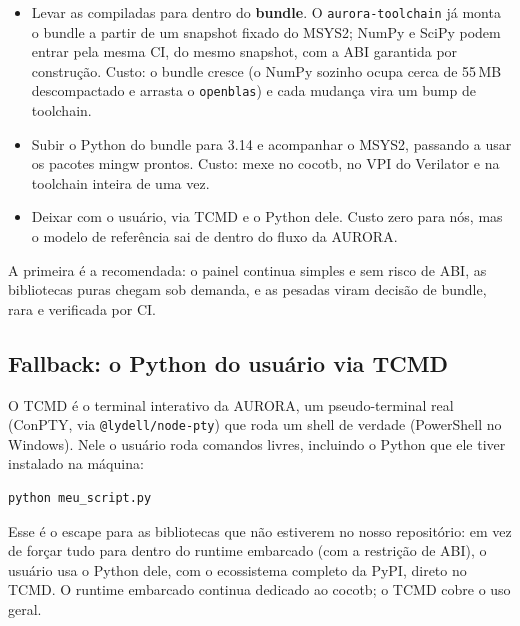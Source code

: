 \documentclass[11pt,a4paper]{article}
\begin{document}
\begin{itemize}
  \item Levar as compiladas para dentro do \textbf{bundle}. O
        \texttt{aurora-toolchain} já monta o bundle a partir de um snapshot
        fixado do MSYS2; NumPy e SciPy podem entrar pela mesma CI, do mesmo
        snapshot, com a ABI garantida por construção. Custo: o bundle cresce (o
        NumPy sozinho ocupa cerca de 55\,MB descompactado e arrasta o
        \texttt{openblas}) e cada mudança vira um bump de toolchain.
  \item Subir o Python do bundle para 3.14 e acompanhar o MSYS2, passando a usar
        os pacotes mingw prontos. Custo: mexe no cocotb, no VPI do Verilator e na
        toolchain inteira de uma vez.
  \item Deixar com o usuário, via TCMD e o Python dele. Custo zero para nós, mas
        o modelo de referência sai de dentro do fluxo da AURORA.
\end{itemize}

A primeira é a recomendada: o painel continua simples e sem risco de ABI, as
bibliotecas puras chegam sob demanda, e as pesadas viram decisão de bundle, rara
e verificada por CI.

\subsection{Fallback: o Python do usuário via TCMD}

O TCMD é o terminal interativo da AURORA, um pseudo-terminal real (ConPTY, via
\texttt{@lydell/node-pty}) que roda um shell de verdade (PowerShell no Windows).
Nele o usuário roda comandos livres, incluindo o Python que ele tiver instalado
na máquina:

\begin{lstlisting}[language=bash]
python meu_script.py
\end{lstlisting}

Esse é o escape para as bibliotecas que não estiverem no nosso repositório: em
vez de forçar tudo para dentro do runtime embarcado (com a restrição de ABI), o
usuário usa o Python dele, com o ecossistema completo da PyPI, direto no TCMD. O
runtime embarcado continua dedicado ao cocotb; o TCMD cobre o uso geral.
\end{document}
